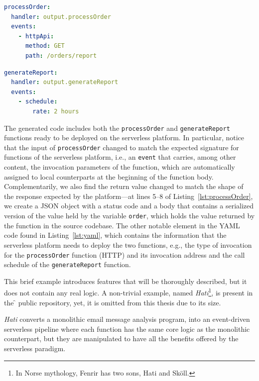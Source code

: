 \begin{minipage}{\textwidth}
\begin{minipage}[t]{.5\textwidth}
\begin{lstlisting}[language=yaml]
processOrder:
  handler: output.processOrder 
  events:
    - httpApi: 
      method: GET
      path: /orders/report
\end{lstlisting}
\end{minipage}
\begin{minipage}[t]{.5\textwidth}
\begin{lstlisting}[language=yaml,firstnumber=last]
generateReport:
  handler: output.generateReport
  events:
    - schedule:
        rate: 2 hours
\end{lstlisting}
\end{minipage}
\end{minipage}

The generated code includes both the \verb|processOrder| and \verb|generateReport| functions ready to
be deployed on the serverless platform. In particular, notice that the input of
\verb|processOrder| changed to match the expected signature for functions of
the serverless platform, i.e., an \verb|event| that carries, among other
content, the invocation parameters of the function, which are automatically
assigned to local counterparts at the beginning of the function body.
Complementarily, we also find the return value changed to match the shape of the
response expected by the platform---at lines 5--8 of
Listing~\ref{lst:processOrder}, we create a JSON object with a status code and a
body that contains a serialized version of the value held by the variable
\verb|order|, which holds the value returned by the function in the source
codebase.
The other notable element in the YAML code found in
Listing~\ref{lst:yaml}, which contains the information that the serverless
platform needs to deploy the two functions, e.g., the type of invocation for the
\verb|processOrder| function (HTTP) and its invocation address and the call
schedule of the \verb|generateReport| function.

This brief example introduces features that will be thoroughly described,
but it does not contain any real logic.
A non-trivial example, named \textit{Hati}\footnote{In Norse mythology, Fenrir has two sons, Hati and Sköll.},
is present in the \f{} public repository, yet, it is omitted from this thesis due to its size.

\textit{Hati} converts a monolithic email message analysis program,
into an event-driven serverless pipeline where each function
has the same core logic as the monolithic counterpart, but they are manipulated to have
all the benefits offered by the serverless paradigm.

